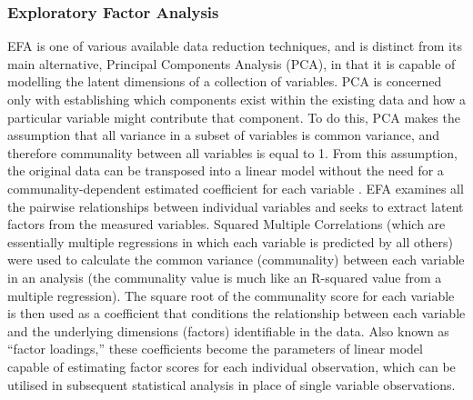 \begin{CJK}{UTF8}{gbsn}
\subsubsection{Exploratory Factor Analysis\label{app8:EFA}}
EFA is one of various available data reduction techniques, and is distinct from its main alternative, Principal Components Analysis (PCA), in that it is capable of modelling the latent dimensions of a collection of variables. PCA is concerned only with establishing which components exist within the existing data and how a particular variable might contribute that component. To do this, PCA makes the assumption that all variance in a subset of variables is common variance, and therefore communality between all variables is equal to 1. From this assumption, the original data can be transposed into a linear model without the need for a communality-dependent estimated coefficient for each variable \citep{Widaman2007}. EFA examines all the pairwise relationships between individual variables and seeks to extract latent factors from the measured variables.  Squared Multiple Correlations (which are essentially multiple regressions in which each variable is predicted by all others) were used to calculate the common variance (communality) between each variable in an analysis (the communality value is much like an R-squared value from a multiple regression).
The square root of the communality score for each variable is then used as a coefficient that conditions the relationship between each variable and the underlying dimensions (factors) identifiable in the data. Also known as ``factor loadings,'' these coefficients become the parameters of linear model capable of estimating factor scores for each individual observation, which can be utilised in subsequent statistical analysis in place of single variable observations.


\end{CJK}
